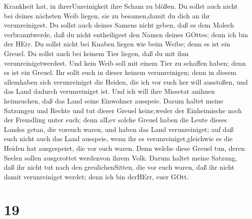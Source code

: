 Krankheit hat, in ihrerUnreinigkeit ihre Scham zu blößen. 
Du sollst auch nicht bei deines nächsten Weib liegen, sie zu
besamen,damit du dich an ihr verunreinigest.  Du sollst
auch deines Samens nicht geben, daß es dem Molech verbranntwerde, daß du
nicht entheiligest den Namen deines GOttes; denn ich bin der HErr.
 Du sollst nicht bei Knaben liegen wie beim Weibe; denn es
ist ein Greuel.  Du sollst auch bei keinem Tier liegen, daß
du mit ihm verunreinigetwerdest. Und kein Weib soll mit einem Tier zu
schaffen haben; denn es ist ein Greuel.  Ihr sollt euch in
dieser keinem verunreinigen; denn in diesem allemhaben sich
verunreiniget die Heiden, die ich vor euch her will ausstoßen,
 und das Land dadurch verunreiniget ist. Und ich will ihre
Missetat anihnen heimsuchen, daß das Land seine Einwohner ausspeie.
 Darum haltet meine Satzungen und Rechte und tut dieser
Greuel keine,weder der Einheimische noch der Fremdling unter euch;
 denn alLev solche Greuel haben die Leute dieses Landes
getan, die voreuch waren, und haben das Land verunreiniget;
 auf daß euch nicht auch das Land ausspeie, wenn ihr es
verunreiniget,gleichwie es die Heiden hat ausgespeiet, die vor euch
waren.  Denn welche diese Greuel tun, deren Seelen sollen
ausgerottet werdenvon ihrem Volk.  Darum haltet meine
Satzung, daß ihr nicht tut nach den greulichenSitten, die vor euch
waren, daß ihr nicht damit verunreiniget werdet; denn ich bin derHErr,
euer GOtt.

\hypertarget{section-18}{%
\section{19}\label{section-18}}

